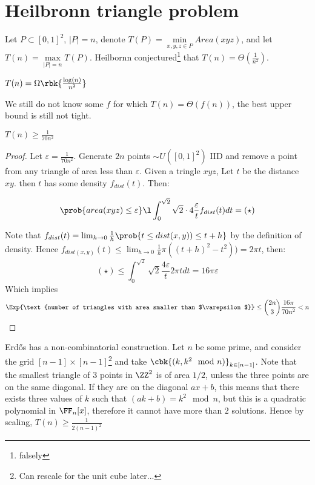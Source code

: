 \documentclass[a4paper, 11pt, oneside]{book}
\begin{document}
\section{Heilbronn triangle problem}
Let $P\subset [0,1]^2$, $|P| = n$, denote $T(P) = \underset{x,y,z\in P}{\min} Area(xyz)$, and let $T(n) = \underset{|P| = n}{\max} T(P)$. Heilbornn conjectured\footnote{falsely} that $T(n) = \Theta(\frac{1}{n^2})$.
\begin{thm}
	 $T(n) = \Omega\rbk{\frac{\log(n)}{n^2}}$
\end{thm}
\begin{remark}
	We still do not know some $f$ for which $T(n) = \Theta(f(n))$, the best upper bound is still not tight.
\end{remark}
\begin{thm}
	$T(n) \ge \frac{1}{70n^2}$
\end{thm}
\begin{proof}
	Let $\varepsilon=\frac{1}{70n^2}$. Generate $2n$ points $\sim U([0,1]^2)$ IID and remove a point from any triangle of area less than $\varepsilon$. Given a tringle $xyz$, Let $t$ be the distance $xy$. then $t$ has some density $f_{dist}(t)$. Then:
	
	\[
	\prob{area(xyz)\le \varepsilon} \l \int_0^{\sqrt{2}}\sqrt{2}\cdot 4\frac{\varepsilon}{t}f_{dist}(t)dt = (\star)
	\]
	
	Note that $f_{dist}(t) = \lim_{h\to 0}\frac{1}{h}\prob{t\le dist(x,y)) \le t+h}$ by the definition of density. Hence $f_{dist(x,y)}(t)\le \lim_{h\to 0}\frac{1}{h}\pi((t+h)^2 - t^2)) = 2\pi t$, then:
	\[
	(\star) \le \int_0^{\sqrt{2}} \sqrt{2}\frac{4\varepsilon}{t}2\pi t dt = 16\pi \varepsilon
	\]
	Which implies
	\[
	\Exp{\text{number of triangles with area smaller than $\varepsilon$}} \le {2n\choose 3} \frac{16\pi }{70n^2} < n
	\]
\end{proof}
\begin{remark}
	Erd\H{o}s has a non-combinatorial construction. Let $n$ be some prime, and consider the grid $[n-1]\times [n-1]$\footnote{Can rescale for the unit cube later...} and take $\cbk{(k,k^2\mod n)}_{k\in [n-1]}$. Note that the smallest triangle of $3$ points in $\ZZ^2$ is of area $1/2$, unless the three points are on the same diagonal. If they are on the diagonal $ax+b$, this means that there exists three values of $k$ such that $(ak+b) = k^2 \mod n$, but this is a quadratic polynomial in $\FF_n[x]$, therefore it cannot have more than $2$ solutions. Hence by scaling, $T(n) \ge \frac{1}{2(n-1)^2}$
\end{remark}
\end{document}

